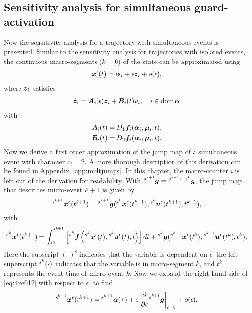 \documentclass[../DC2017114Bouma.tex]{subfiles}
\begin{document}
\subsection{Sensitivity analysis for simultaneous guard-activation}
Now the sensitivity analysis for a trajectory with simultaneous events is presented. Similar to the sensitivity analysis for trajectories with isolated events, the continuous macro-segments ($k=0$) of the state can be approximated using
\begin{align}
{\boldsymbol{x}}_i^\epsilon(t) = \bar{\boldsymbol{\alpha}}_i + \epsilon\bar{{\boldsymbol{z}}}_i + o(\epsilon),
\end{align}
where ${\boldsymbol{z}}_i$ satisfies
\begin{align}
\dot{{\boldsymbol{z}}}_i = {\boldsymbol{A}}_i(t){\boldsymbol{z}}_i +{\boldsymbol{B}}_i(t){\boldsymbol{v}}_i,\quad i\in \operatorname{\textnormal{dom}}\boldsymbol{\alpha}
\end{align}
with
\begin{align*}
{\boldsymbol{A}}_i(t) &= D_1{\boldsymbol{f}}_i(\boldsymbol{\alpha}_i,\boldsymbol{\mu}_i,t),\\
{\boldsymbol{B}}_i(t) &= D_2{\boldsymbol{f}}_i(\boldsymbol{\alpha}_i,\boldsymbol{\mu}_i,t).
\end{align*}
Now we derive a first order approximation of the jump map of a simultaneous event with character $c_i = 2$. A more thorough description of this derivation can be found in Appendix~\ref{app:multjumps}. In this chapter, the macro-counter $i$ is left out of the derivation for readability. With $\hspace{0cm}^{s^{k+1}}{\boldsymbol{g}} = \hspace{0cm}^{s^{k+1}\leftarrow s^k}{\boldsymbol{g}}$, the jump map that describes micro-event $k+1$ is given by
\begin{align}
\hspace{0cm}^{s^{k+1}}{\boldsymbol{x}}^\epsilon(t^{k+1}) = \hspace{0cm}^{s^{k+1}}{\boldsymbol{g}}(\hspace{0cm}^{s^{k}}{\boldsymbol{x}}^\epsilon(t^{k+1}),\hspace{0cm}^{s^{k}}{\boldsymbol{u}}^\epsilon(t^{k+1}),t^{k+1}),\label{eq:4xe012}
\end{align}
with
\begin{align}
\hspace{0cm}^{s^{k}}{\boldsymbol{x}}^\epsilon(t^{k+1}) = \int_{t^{k}}^{t^{k+1}}\left[\hspace{0cm}^{s^{k}}{\boldsymbol{f}}\left(\hspace{0cm}^{s^{k}}{\boldsymbol{x}}^\epsilon(t),\hspace{0cm}^{s^{k}}{\boldsymbol{u}}^\epsilon(t),t\right)\right]dt + \hspace{0cm}^{s^{k}}{\boldsymbol{g}}(\hspace{0cm}^{s^{k-1}}{\boldsymbol{x}}^\epsilon(t^{k}),\hspace{0cm}^{s^{k-1}}{\boldsymbol{u}}^\epsilon(t^{k}),t^{k}).\label{eq:4xe01}
\end{align}
Here the subscript $(\cdot)^\epsilon$ indicates that the variable is dependent on $\epsilon$, the left superscript $\hspace{0cm}^{s^k}(\cdot)$ indicates that the variable is in micro-segment $k$, and $t^k$ represents the event-time of micro-event $k$. Now we expand the right-hand side of \eqref{eq:4xe012} with respect to $\epsilon$, to find
\begin{align}
\hspace{0cm}^{s^{k+1}}{\boldsymbol{x}}^\epsilon(t^{k+1}) = \hspace{0cm}^{s^{k+1}}\boldsymbol{\alpha}(\tau) + \epsilon\left.\frac{\partial}{\partial\epsilon}\hspace{0cm}^{s^{k+1}}{\boldsymbol{g}}\right|_{\epsilon=0} + o(\epsilon),\label{eq:4xe012exp}
\end{align}
\end{document}

